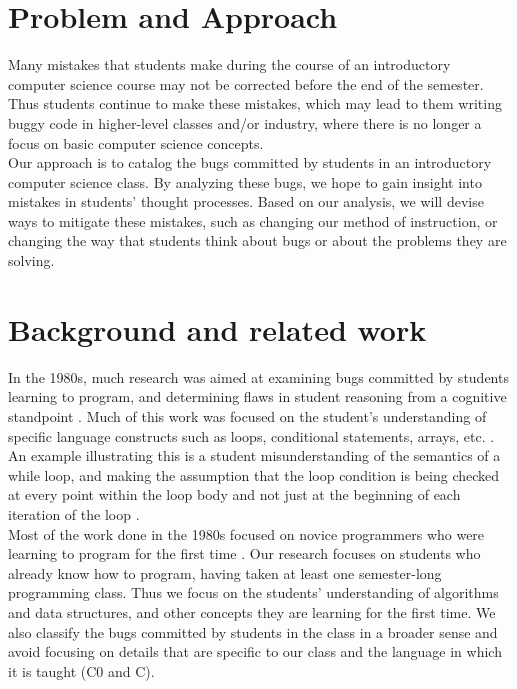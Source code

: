 \documentclass[11pt,letterpaper]{article}
\begin{document}
\section{Problem and Approach}
Many mistakes that students make during the course of an introductory computer science course may not be corrected before the end of the semester. Thus students continue to make these mistakes, which may lead to them writing buggy code in higher-level classes and/or industry, where there is no longer a focus on basic computer science concepts.\\

Our approach is to catalog the bugs committed by students in an introductory computer science class. By analyzing these bugs, we hope to gain insight into mistakes in students' thought processes. Based on our analysis, we will devise ways to mitigate these mistakes, such as changing our method of instruction, or changing the way that students think about bugs or about the problems they are solving.

\section{Background and related work}
\label{sec:background}

In the 1980s, much research was aimed at examining bugs committed by students learning to program, and determining flaws in student reasoning from a cognitive standpoint \cite{JoniSolowayGoldmanEhrlich83, PutnamSleemanBaxterKuspa86, SpohrerSoloway86, Pea86}. Much of this work was focused on the student's understanding of specific language constructs such as loops, conditional statements, arrays, etc. \cite{JoniSolowayGoldmanEhrlich83, PutnamSleemanBaxterKuspa86, Pea86}. An example illustrating this is a student misunderstanding of the semantics of a while loop, and making the assumption that the loop condition is being checked at every point within the loop body and not just at the beginning of each iteration of the loop \cite{Pea86}.\\

Most of the work done in the 1980s focused on novice programmers who were learning to program for the first time \cite{SpohrerSoloway86, Pea86}. Our research focuses on students who already know how to program, having taken at least one semester-long programming class. Thus we focus on the students' understanding of algorithms and data structures, and other concepts they are learning for the first time. We also classify the bugs committed by students in the class in a broader sense and avoid focusing on details that are specific to our class and the language in which it is taught (C0 and C).\\
\end{document}
